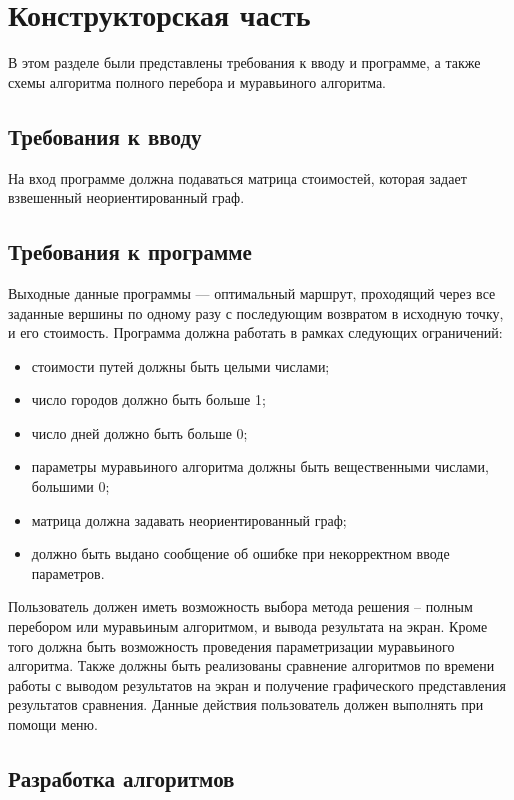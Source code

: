 \chapter{Конструкторская часть}
В этом разделе были представлены требования к вводу и программе, а также схемы алгоритма полного перебора и муравьиного алгоритма.

\section{Требования к вводу}
На вход программе должна подаваться матрица стоимостей, которая задает взвешенный неориентированный граф. 

\section{Требования к программе}
Выходные данные программы --- оптимальный маршрут, проходящий через все заданные вершины по одному разу с последующим возвратом в исходную точку, и его стоимость. Программа должна работать в рамках следующих ограничений: 

\begin{itemize}[label = ---]
 \item стоимости путей должны быть целыми числами;
 \item число городов должно быть больше 1;
 \item число дней должно быть больше 0;
 \item параметры муравьиного алгоритма должны быть вещественными числами, большими 0;
 \item матрица должна задавать неориентированный граф;
 \item должно быть выдано сообщение об ошибке при некорректном вводе параметров.
\end{itemize}

Пользователь должен иметь возможность выбора метода решения -- полным перебором или муравьиным алгоритмом, и вывода результата на экран. Кроме того должна быть возможность проведения параметризации муравьиного алгоритма. Также должны быть реализованы сравнение алгоритмов по времени работы с выводом результатов на экран и получение графического представления результатов сравнения. Данные действия пользователь должен выполнять при помощи меню.

\section{Разработка алгоритмов}

